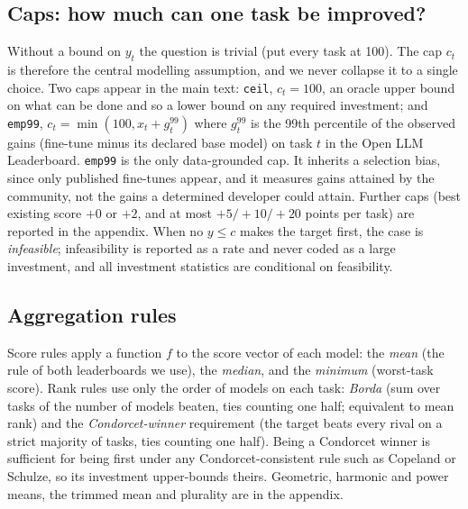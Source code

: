 \documentclass{article}
\begin{document}
\subsection{Caps: how much can one task be improved?}
\label{sec:caps}
Without a bound on $y_t$ the question is trivial (put every task at 100). The cap $c_t$ is therefore the central modelling assumption, and we never collapse it to a single choice. Two caps appear in the main text: \texttt{ceil}, $c_t=100$, an oracle upper bound on what can be done and so a lower bound on any required investment; and \texttt{emp99}, $c_t=\min(100,x_t+g_t^{99})$ where $g_t^{99}$ is the 99th percentile of the observed gains (fine-tune minus its declared base model) on task $t$ in the Open LLM Leaderboard. \texttt{emp99} is the only data-grounded cap. It inherits a selection bias, since only published fine-tunes appear, and it measures gains attained by the community, not the gains a determined developer could attain. Further caps (best existing score $+0$ or $+2$, and at most $+5/+10/+20$ points per task) are reported in the appendix. When no $y\le c$ makes the target first, the case is \emph{infeasible}; infeasibility is reported as a rate and never coded as a large investment, and all investment statistics are conditional on feasibility.

\subsection{Aggregation rules}
\label{sec:rules}
Score rules apply a function $f$ to the score vector of each model: the \emph{mean} (the rule of both leaderboards we use), the \emph{median}, and the \emph{minimum} (worst-task score). Rank rules use only the order of models on each task: \emph{Borda} (sum over tasks of the number of models beaten, ties counting one half; equivalent to mean rank) and the \emph{Condorcet-winner} requirement (the target beats every rival on a strict majority of tasks, ties counting one half). Being a Condorcet winner is sufficient for being first under any Condorcet-consistent rule such as Copeland or Schulze, so its investment upper-bounds theirs. Geometric, harmonic and power means, the trimmed mean and plurality are in the appendix.
\end{document}
